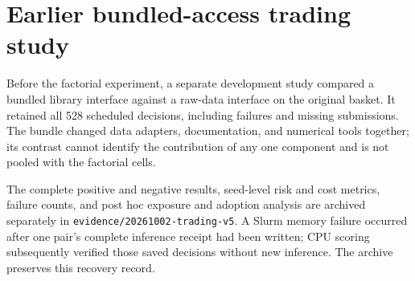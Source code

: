 \documentclass[11pt]{article}
\begin{document}
\section{Earlier bundled-access trading study}
Before the factorial experiment, a separate development study compared a bundled library
interface against a raw-data interface on the original basket. It retained all 528
scheduled decisions, including failures and missing submissions. The bundle changed data
adapters, documentation, and numerical tools together; its contrast cannot identify the
contribution of any one component and is not pooled with the factorial cells.

The complete positive and negative results, seed-level risk and cost metrics, failure
counts, and post hoc exposure and adoption analysis are archived separately in
\texttt{evidence/20261002-trading-v5}. A Slurm memory failure occurred after one pair's
complete inference receipt had been written; CPU scoring subsequently verified those
saved decisions without new inference. The archive preserves this recovery record.


\clearpage





\clearpage

\clearpage

\clearpage



\end{document}
